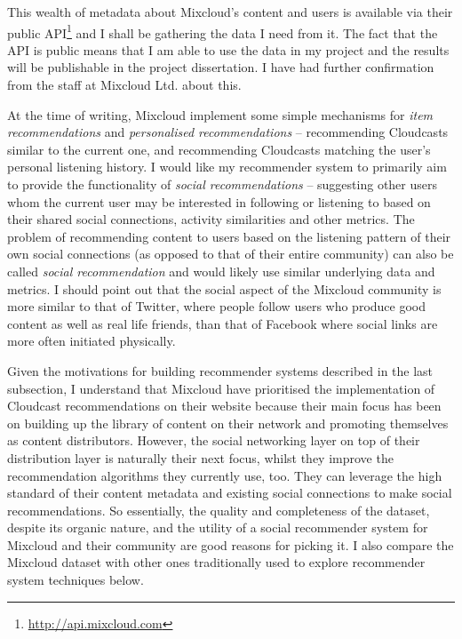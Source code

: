 \documentclass[a4paper,12pt,twoside,notitlepage,draft]{report}
\begin{document}
This wealth of metadata about Mixcloud's content and users is available via 
their public API\footnote{\url{http://api.mixcloud.com}} and I shall be 
gathering the data I need from it. The fact that the API is public means that I 
am able to use the data in my project and the results will be publishable in 
the project dissertation. I have had further confirmation from the staff at 
Mixcloud Ltd. about this.

At the time of writing, Mixcloud implement some simple mechanisms for 
\emph{item recommendations} and \emph{personalised recommendations} -- 
recommending Cloudcasts similar to the current one, and recommending Cloudcasts 
matching the user's personal listening history. I would like my recommender 
system to primarily aim to provide the functionality of 
\emph{social recommendations} -- suggesting other users whom the current user 
may be interested in following or listening to based on their shared social 
connections, activity similarities and other metrics. The problem of 
recommending content to users based on the listening pattern of their own 
social connections (as opposed to that of their entire community) can also be 
called \emph{social recommendation} and would likely use similar underlying 
data and metrics. I should point out that the social aspect of the Mixcloud 
community is more similar to that of Twitter, where people follow users who 
produce good content as well as real life friends, than that of Facebook where 
social links are more often initiated physically.

Given the motivations for building recommender systems described in the last 
subsection, I understand that Mixcloud have prioritised the implementation of 
Cloudcast recommendations on their website because their main focus has been on 
building up the library of content on their network and promoting themselves as 
content distributors. However, the social networking layer on top of their 
distribution layer is naturally their next focus, whilst they improve the 
recommendation algorithms they currently use, too. They can leverage the high 
standard of their content metadata and existing social connections to make 
social recommendations. So essentially, the quality and completeness of the 
dataset, despite its organic nature, and the utility of a social recommender 
system for Mixcloud and their community are good reasons for picking it. I also 
compare the Mixcloud dataset with other ones traditionally used to explore 
recommender system techniques below.
\end{document}

